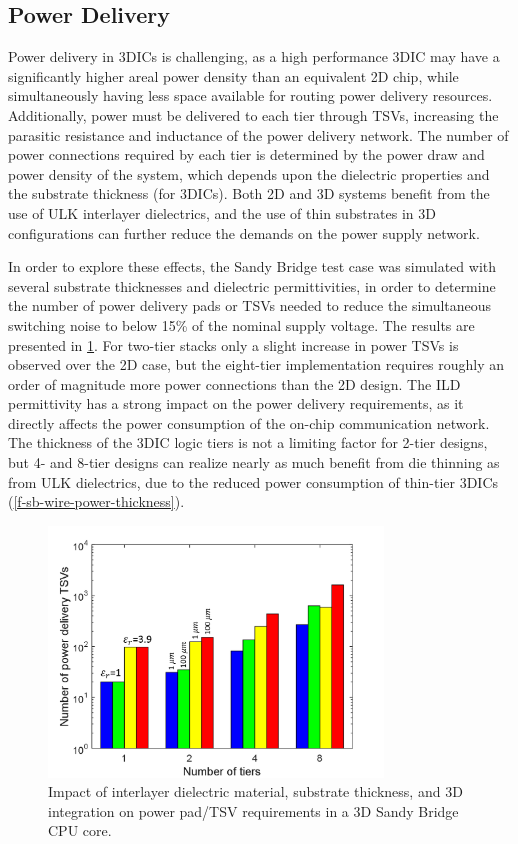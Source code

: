 \documentclass[journal,twoside]{IEEEtran}
\newcommand{\rechanged}[1]{\textcolor{red}{#1}}
\renewcommand{\rechanged}[1]{#1} %
\begin{document}
\subsection{Power Delivery}
Power delivery in 3DICs is challenging, as a high performance 3DIC may have a significantly
higher areal power density than an equivalent 2D chip, while simultaneously having less space available for
routing power delivery resources. Additionally, power must be delivered to each tier
through TSVs, increasing the parasitic resistance and inductance of the power delivery network.
The number of power connections required by each tier is determined by the power draw and power density 
of the system,
which depends upon the dielectric properties and the substrate thickness (for 3DICs).
Both 2D and 3D systems benefit from the use of ULK interlayer dielectrics, and 
the use of thin substrates in 3D configurations can further reduce the demands on the power supply network.

In order to explore these effects, the Sandy Bridge test case was simulated with several substrate thicknesses and 
dielectric permittivities, in order to determine the number of power delivery pads or TSVs needed to reduce
the simultaneous switching noise to below 15\% of the nominal supply voltage. The results are presented in \cref{f-3d-psn-ild-tiers}.
For two-tier stacks only a slight increase in power TSVs is observed over the 2D case, but
the eight-tier implementation requires roughly an order of magnitude
more power connections than the 2D design. The ILD permittivity has a strong impact on the power delivery requirements,
as it directly affects the power consumption of the on-chip communication network. The thickness 
of the 3DIC logic tiers is not a limiting factor for 2-tier designs, but 4- and 8-tier designs can realize nearly as much benefit
from die thinning as from ULK dielectrics\rechanged{, due to the reduced power consumption of thin-tier 3DICs (\cref{f-sb-wire-power-thickness}).}

\begin{figure}[tb]
	\centering
	\includegraphics[width=3.5in]{Figures/sb3d_psn_vs_ild_and_tiers_vacuum_vs_sio2_3.png}
	\caption{
		Impact of interlayer dielectric material, substrate thickness, and 3D 
		integration on power pad/TSV requirements in a 3D Sandy Bridge CPU core.
	}
	\label{f-3d-psn-ild-tiers}
\end{figure}
\end{document}
